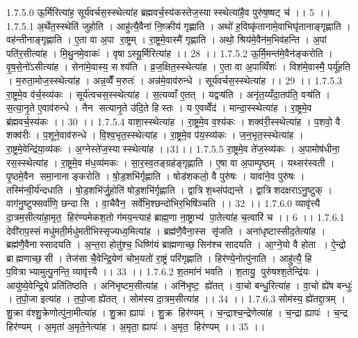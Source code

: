 1.7.5.0
ऊ॒र्मिरित्या॑ह॒ सूर्य॑वर्चस॒स्स्थेत्या॑ह ब्रह्मवर्च॒स्य॑कस्तेज॒स्यास्स्थेत्या॑है॒व पुरु॑ष॒ष्षट् च॑ ।। 5 ।।
1.7.5.1
अ॒र्थेत॒स्स्थेति॑ जुहोति । आहु॑त्यै॒वैना॑ नि॒ष्क्रीय॑ गृह्णाति । अथो॑ ह॒विष्कृ॑तानामे॒वाभिघृ॑तानाङ्गृह्णाति । वह॑न्तीनाङ्गृह्णाति । ए॒ता वा अ॒पा रा॒ष्ट्रम् । रा॒ष्ट्रमे॒वास्मै॑ गृह्णाति । अथो॒ श्रिय॑मे॒वैन॑म॒भिव॑हन्ति । अ॒पां पति॑र॒सीत्या॑ह । मि॒थु॒नमे॒वाकः॑ । वृषाऽस्यू॒र्मिरित्या॑ह ।। 28 ।।
1.7.5.2
ऊ॒र्मि॒मन्त॑मे॒वैन॑ङ्करोति । वृ॒ष॒से॒नो॑ऽसीत्या॑ह । सेना॑मे॒वास्य॒ सश्य॑ति । व्र॒ज॒क्षित॒स्स्थेत्या॑ह । ए॒ता वा अ॒पाव्विँशः॑ । विश॑मे॒वास्मै॒ पर्यू॑हति । म॒रुता॒मोज॒स्स्थेत्या॑ह । अन्न॒व्वैँ म॒रुतः॑ । अन्न॑मे॒वाव॑रुन्धे । सूर्य॑वर्चस॒स्स्थेत्या॑ह ।। 29 ।।
1.7.5.3
रा॒ष्ट्रमे॒व व॑र्च॒स्व्य॑कः । सूर्य॑त्वचस॒स्स्थेत्या॑ह । स॒त्यव्वाँ ए॒तत् । यद्वऱ्ष॑ति । अनृ॑त॒य्यँदा॒तप॑ति॒ वऱ्ष॑ति । स॒त्या॒नृ॒ते ए॒वाव॑रुन्धे । नैन॑ सत्यानृ॒ते उ॑दि॒ते हि॑स्तः । य ए॒वव्वेँद॑ । मान्दा॒स्स्थेत्या॑ह । रा॒ष्ट्रमे॒व ब्र॑ह्मवर्च॒स्य॑कः ।। 30 ।।
1.7.5.4
वाशा॒स्स्थेत्या॑ह । रा॒ष्ट्रमे॒व व॒श्य॑कः । शक्व॑री॒स्स्थेत्या॑ह । प॒शवो॒ वै शक्व॑रीः । प॒शूने॒वाव॑रुन्धे । वि॒श्व॒भृत॒स्स्थेत्या॑ह । रा॒ष्ट्रमे॒व प॑य॒स्व्य॑कः । ज॒न॒भृत॒स्स्थेत्या॑ह । रा॒ष्ट्रमे॒वेन्द्रि॑या॒व्य॑कः । अ॒ग्नेस्ते॑ज॒स्यास्स्थेत्या॑ह ।।31।।
1.7.5.5
रा॒ष्ट्रमे॒व ते॑ज॒स्व्य॑कः । अ॒पामोष॑धीना॒॒ रस॒स्स्थेत्या॑ह । रा॒ष्ट्रमे॒व म॑ध॒व्य॑मकः । सा॒र॒स्व॒तङ्ग्रह॑ङ्गृह्णाति । ए॒षा वा अ॒पाम्पृ॒ष्ठम् । यथ्सर॑स्वती । पृ॒ष्ठमे॒वैन॑ समा॒नानाङ्करोति । षो॒ड॒शभि॑र्गृह्णाति । षोड॑शकलो॒ वै पुरु॑षः । यावा॑ने॒व पुरु॑षः । तस्मि॑न्वी॒र्य॑न्दधाति । षो॒ड॒शभि॑र्जु॒होति॑ षोड॒शभि॑र्गृह्णाति । द्वात्रि॑श॒थ्संप॑द्यन्ते । द्वात्रि॑शदक्षराऽनु॒ष्टुक् । वाग॑नु॒ष्टुफ्सर्वा॑णि॒ छन्दा॑सि । वा॒चैवैन॒॒ सर्वे॑भि॒श्छन्दो॑भिर॒भिषि॑ञ्चति ।। 32 ।।
1.7.6.0
व्यावृ॑त्त्यै दा॒त्रम॒सीत्या॑हा॒मृत॒॒ हिर॑ण्यमेकश॒तो ग॑मय॒न्त्याह॑ ब्राह्म॒णा ना॒ष्ट्राभ्य॑ पा॒तेत्या॑ह च॒त्वारि॑ च ।। 6 ।।
1.7.6.1
देवी॑राप॒स्सं मधु॑मती॒र्मधु॑मतीभिस्सृज्यध्व॒मित्या॑ह । ब्रह्म॑णै॒वैना॒स्स सृ॑जति । अना॑धृष्टास्सीद॒तेत्या॑ह । ब्रह्म॑णै॒वैनास्सादयति । अ॒न्त॒रा होतु॑श्च॒ धिष्णि॑यं ब्राह्मणाच्छ॒॒सिन॑श्च सादयति । आ॒ग्ने॒यो वै होता । ऐ॒न्द्रो ब्राह्मणाच्छ॒॒सी । तेज॑सा चै॒वेन्द्रि॒येण॑ चोभ॒यतो॑ रा॒ष्ट्रं परि॑गृह्णाति । हिर॑ण्ये॒नोत्पु॑नाति । आहु॑त्यै॒ हि प॒वित्राभ्यामुत्पु॒नन्ति॒ व्यावृ॑त्त्यै ।। 33 ।।
1.7.6.2
श॒तमा॑नं भवति । श॒तायु॒ पुरु॑षश्श॒तेन्द्रि॑यः । आयु॑ष्ये॒वेन्द्रि॒ये प्रति॑तिष्ठति । अनि॑भृष्टम॒सीत्या॑ह । अनि॑भृष्ट॒॒ ह्ये॑तत् । वा॒चो बन्धु॒रित्या॑ह । वा॒चो ह्ये॑ष बन्धुः॑ । त॒पो॒जा इत्या॑ह । त॒पो॒जा ह्ये॑तत् । सोम॑स्य दा॒त्रम॒सीत्या॑ह ।। 34 ।।
1.7.6.3
सोम॑स्य॒ ह्ये॑तद्दा॒त्रम् । शु॒क्रा व॑श्शु॒क्रेणोत्पु॑ना॒मीत्या॑ह । शु॒क्रा ह्यापः॑ । शु॒क्र हिर॑ण्यम् । च॒न्द्राश्च॒न्द्रेणेत्या॑ह । च॒न्द्रा ह्यापः॑ । च॒न्द्र हिर॑ण्यम् । अ॒मृता॑ अ॒मृते॒नेत्या॑ह । अ॒मृता॒ ह्यापः॑ । अ॒मृत॒॒ हिर॑ण्यम् ।। 35 ।।
